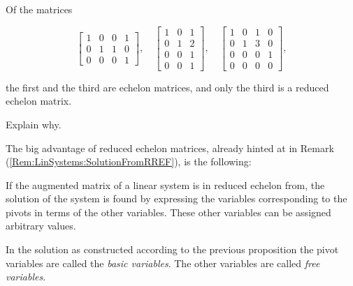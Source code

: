 \begin{ex}
\label{Ex:LinSystems:ReducedEchelonMatrix}
Of the matrices

$$

  
\begin{bmatrix} 1 & 0 & 0 & 1 \\ 0 & 1 & 1 & 0 \\ 0 & 0 & 0 & 1
   \end{bmatrix}, \quad
   
\begin{bmatrix} 1 & 0 & 1  \\ 0 & 1 & 2  \\ 0 & 0 & 1  \\ 0 & 0 & 1
   \end{bmatrix}, \quad
   
\begin{bmatrix} 1 & 0 & 1 & 0 \\ 0 & 1 & 3 & 0\\ 0 & 0 & 0 & 1  \\ 0 & 0 & 0 &0
   \end{bmatrix},
$$

the first and the third are echelon matrices, and only the third is a  reduced echelon matrix.
\end{ex}


\begin{exc}
\label{Exc:LinSystems:CheckNotReducedEchelon}
Explain why.
\end{exc}

The big advantage of reduced echelon matrices, already hinted at in Remark (\ref{Rem:LinSystems:SolutionFromRREF}),  is the following:

\begin{prop}
\label{Prop:LinSystems:SolutionFromRREF}
If the augmented matrix of a linear system is in reduced echelon from, the solution of the system is found by expressing the variables corresponding to the pivots in terms of the other variables.  These other variables can be assigned arbitrary values.
\end{prop}

\begin{dfn}
\label{Dfn:LinSystems:BasicAndFreeVariables}
In the solution as constructed according to the previous proposition the pivot variables are called the \emph{basic variables}. The other variables are called \emph{free variables}.
\end{dfn}


